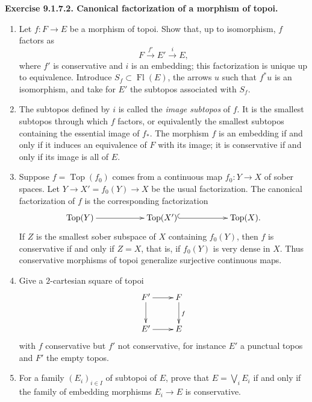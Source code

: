 \documentclass[11pt]{article}
\newcommand{\E}{\mathcal{E}}
\newcommand{\Top}{\operatorname{Top}}
\newcommand{\Fl}{\operatorname{Fl}}
\newenvironment{remarktext}[1]{\par\medskip\noindent\textbf{#1.}\ }{\par\medskip}
\begin{document}
\begin{remarktext}{Exercise 9.1.7.2. Canonical factorization of a morphism of topoi}
\begin{enumerate}[label=\alph*)]
\item Let \(f:F\to E\) be a morphism of topoi. Show that, up to isomorphism, \(f\) factors as
\[
F\xrightarrow{f'}E'\xrightarrow{i}E,
\tag{9.1.7.3}
\]
where \(f'\) is conservative and \(i\) is an embedding; this factorization is unique up to equivalence. Introduce \(S_f\subset\Fl(E)\), the arrows \(u\) such that \(f^*u\) is an isomorphism, and take for \(E'\) the subtopos associated with \(S_f\).

\item The subtopos defined by \(i\) is called the \emph{image subtopos} of \(f\). It is the smallest subtopos through which \(f\) factors, or equivalently the smallest subtopos containing the essential image of \(f_*\). The morphism \(f\) is an embedding if and only if it induces an equivalence of \(F\) with its image; it is conservative if and only if its image is all of \(E\).

\item Suppose \(f=\Top(f_0)\) comes from a continuous map \(f_0:Y\to X\) of sober spaces. Let \(Y\to X'=f_0(Y)\to X\) be the usual factorization. The canonical factorization of \(f\) is the corresponding factorization
\[
\xymatrix@C=2cm{\Top(Y)\ar[r]&\Top(X')\ar@{^{(}->}[r]&\Top(X).}
\]
If \(Z\) is the smallest sober subspace of \(X\) containing \(f_0(Y)\), then \(f\) is conservative if and only if \(Z=X\), that is, if \(f_0(Y)\) is very dense in \(X\). Thus conservative morphisms of topoi generalize surjective continuous maps.

\item Give a \(2\)-cartesian square of topoi
\[
\xymatrix{F'\ar[r]\ar[d]&F\ar[d]^f\\E'\ar[r]&E}
\]
with \(f\) conservative but \(f'\) not conservative, for instance \(E'\) a punctual topos and \(F'\) the empty topos.

\item For a family \((E_i)_{i\in I}\) of subtopoi of \(E\), prove that \(E=\bigvee_iE_i\) if and only if the family of embedding morphisms \(E_i\to E\) is conservative.
\end{enumerate}
\end{remarktext}
\end{document}
